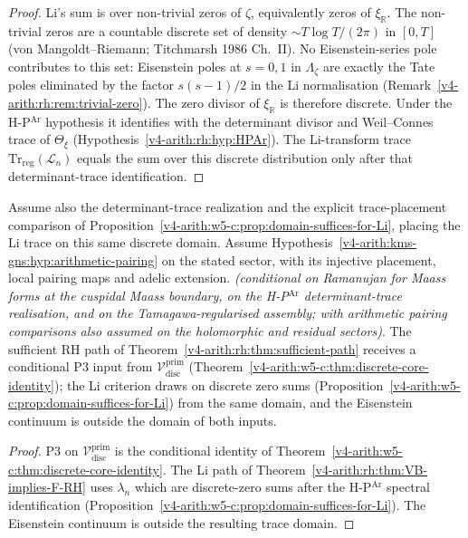 \begin{proof}
Li's sum is over non-trivial zeros of \(\zeta\), equivalently zeros of
\(\xi_{\mathbb R}\). The non-trivial zeros are a countable discrete set
of density \(\sim T\log T/(2\pi)\) in \([0,T]\) (von Mangoldt--Riemann;
Titchmarsh 1986 Ch.~II). No Eisenstein-series pole contributes to
this set: Eisenstein poles at \(s=0,1\) in \(\Lambda_{\zeta}\) are
exactly the Tate poles eliminated by the factor \(s(s-1)/2\) in the
Li normalisation
(Remark~\ref{v4-arith:rh:rem:trivial-zero}). The zero divisor of
\(\xi_{\mathbb R}\) is therefore discrete. Under the
H-P\(^{\mathrm{Ar}}\) hypothesis it identifies with the determinant
divisor and Weil--Connes trace of \(\Theta_{\xi}\)
(Hypothesis~\ref{v4-arith:rh:hyp:HPAr}). The Li-transform trace
\(\mathrm{Tr}_{\mathrm{reg}}(\mathcal L_{n})\) equals the sum over
this discrete distribution only after that determinant-trace
identification.
\end{proof}

\begin{corollary}
\label{v4-arith:w5-c:cor:Li-path-closes}
Assume also the determinant-trace realization and the explicit
trace-placement comparison of
Proposition~\ref{v4-arith:w5-c:prop:domain-suffices-for-Li},
placing the Li trace on this same discrete domain.
Assume Hypothesis~\ref{v4-arith:kms-gns:hyp:arithmetic-pairing}
on the stated sector, with its injective placement, local pairing maps
and adelic extension.
\emph{(conditional on Ramanujan for Maass
forms at the cuspidal Maass boundary, on the H-P\(^{\mathrm{Ar}}\)
determinant-trace realisation, and on the Tamagawa-regularised assembly;
with arithmetic pairing comparisons also assumed on the holomorphic
and residual sectors)}. The sufficient RH path of Theorem~\ref{v4-arith:rh:thm:sufficient-path} receives
a conditional P3 input from \(\mathcal{V}^{\mathrm{prim}}_{\mathrm{disc}}\)
(Theorem~\ref{v4-arith:w5-c:thm:discrete-core-identity}); the Li criterion
draws on discrete zero sums (Proposition~\ref{v4-arith:w5-c:prop:domain-suffices-for-Li})
from the same domain, and the Eisenstein continuum is outside the
domain of both inputs.
\end{corollary}

\begin{proof}
P3 on \(\mathcal{V}^{\mathrm{prim}}_{\mathrm{disc}}\) is the conditional
identity of Theorem~\ref{v4-arith:w5-c:thm:discrete-core-identity}. The Li path of
Theorem~\ref{v4-arith:rh:thm:VB-implies-F-RH} uses \(\lambda_{n}\) which
are discrete-zero sums after the H-P\(^{\mathrm{Ar}}\) spectral
identification (Proposition~\ref{v4-arith:w5-c:prop:domain-suffices-for-Li}).
The Eisenstein continuum is outside the resulting trace domain.
\end{proof}

